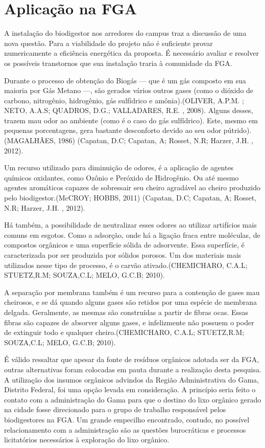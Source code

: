 \section {Aplicação na FGA}
A instalação do biodigestor nos arredores do campus traz a discussão de uma nova questão. Para a viabilidade do projeto não é suficiente provar numericamente a eficiência energética da proposta. É necessário avaliar e resolver os possíveis transtornos que sua instalação traria à comunidade da FGA.
\par Durante o processo de obtenção do Biogás — que é um gás composto em sua maioria por Gás Metano —, são gerados vários outros gases (como o dióxido de carbono, nitrogênio, hidrogênio, gás sulfídrico e amônia).(OLIVER, A.P.M. ; NETO, A.A.S; QUADROS, D.G.; VALLADARES, R.E. , 2008). Alguns desses, trazem mau odor ao ambiente (como é o caso do gás sulfídrico). Este, mesmo em pequenas porcentagens, gera bastante desconforto devido ao seu odor pútrido).(MAGALHÃES, 1986) (Capatan, D.C; Capatan, A; Rosset, N.R; Harzer, J.H. , 2012).
\par Um recurso utilizado para diminuição de odores, é a aplicação de agentes químicos oxidantes, como Ozônio e Peróxido de Hidrogênio. Ou até mesmo agentes aromáticos capazes de sobressair seu cheiro agradável ao cheiro produzido pelo biodigestor.(McCROY; HOBBS, 2011) (Capatan, D.C; Capatan, A; Rosset, N.R; Harzer, J.H. , 2012).
\par Há também, a possibilidade de neutralizar esses odores ao utilizar artifícios mais comuns em esgotos. Como a adsorção, onde há a ligação fraca entre moléculas, de compostos orgânicos e uma superfície sólida de adsorvente. Essa superfície, é caracterizada por ser produzida por sólidos porosos. Um dos materiais mais utilizados nesse tipo de processo, é o carvão ativado.(CHEMICHARO, C.A.L; STUETZ,R.M; SOUZA,C.L; MELO, G.C.B; 2010).
\par A separação por membrana também é um recurso para a contenção de gases mau cheirosos, e se dá quando alguns gases são retidos por uma espécie de membrana delgada. Geralmente, as mesmas são construídas a partir de fibras ocas. Essas fibras são capazes de absorver alguns gases, e infelizmente não possuem o poder de extinguir todo e qualquer cheiro.(CHEMICHARO, C.A.L; STUETZ,R.M; SOUZA,C.L; MELO, G.C.B; 2010).
\par É válido ressaltar que apesar da fonte de resíduos orgânicos adotada ser da FGA, outras alternativas foram colocadas em pauta durante a realização desta pesquisa. A utilização dos insumos orgânicos advindos da Região Administrativa do Gama, Distrito Federal, foi uma opção levada em consideração. A princípio seria feito o contato com a administração do Gama para que o destino do lixo orgânico gerado na cidade fosse direcionado para o grupo de trabalho responsável pelos biodigestores na FGA. Um grande empecilho encontrado, contudo, no possível relacionamento com a administração são as questões burocráticas e processos licitatórios necessários à exploração do lixo orgânico.
